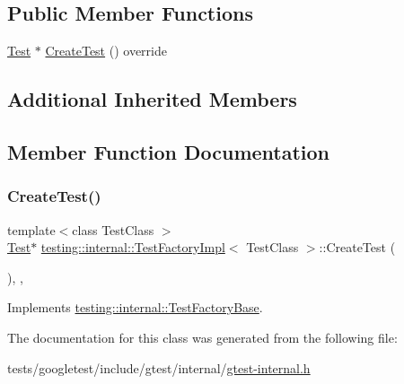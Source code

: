 \subsection*{Public Member Functions}
\begin{DoxyCompactItemize}
\item 
\hyperlink{classtesting_1_1Test}{Test} $\ast$ \hyperlink{classtesting_1_1internal_1_1TestFactoryImpl_ab9b9236ef39b14f0a78e611748e970e3}{Create\+Test} () override
\end{DoxyCompactItemize}
\subsection*{Additional Inherited Members}


\subsection{Member Function Documentation}
\mbox{\label{classtesting_1_1internal_1_1TestFactoryImpl_ab9b9236ef39b14f0a78e611748e970e3}} 
\subsubsection{\texorpdfstring{Create\+Test()}{CreateTest()}}
{\footnotesize\ttfamily template$<$class Test\+Class $>$ \\
\hyperlink{classtesting_1_1Test}{Test}$\ast$ \hyperlink{classtesting_1_1internal_1_1TestFactoryImpl}{testing\+::internal\+::\+Test\+Factory\+Impl}$<$ Test\+Class $>$\+::Create\+Test (\begin{DoxyParamCaption}{ }\end{DoxyParamCaption})\hspace{0.3cm}{\ttfamily [inline]}, {\ttfamily [override]}, {\ttfamily [virtual]}}



Implements \hyperlink{classtesting_1_1internal_1_1TestFactoryBase_a07ac3ca0b196cdb092da0bb186b7c030}{testing\+::internal\+::\+Test\+Factory\+Base}.



The documentation for this class was generated from the following file\+:\begin{DoxyCompactItemize}
\item 
tests/googletest/include/gtest/internal/\hyperlink{gtest-internal_8h}{gtest-\/internal.\+h}\end{DoxyCompactItemize}
